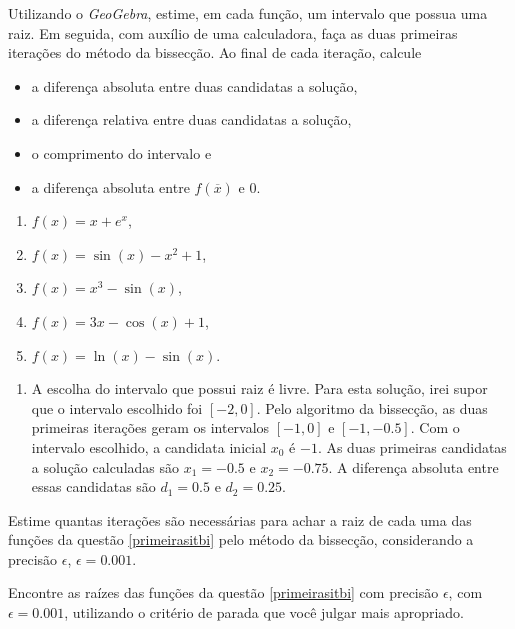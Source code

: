 \begin{ex}\label{primeirasitbi}
Utilizando o \emph{GeoGebra}, estime, em cada função, um intervalo que possua uma raiz. Em seguida, com auxílio de uma calculadora, faça as duas primeiras iterações do método da bissecção. Ao final de cada iteração, calcule 
\begin{itemize}
\item a diferença absoluta entre duas candidatas a solução, 
\item a diferença relativa entre duas candidatas a solução, 
\item o comprimento do intervalo e 
\item a diferença absoluta entre $f(\overline{x})$ e $0.$
\end{itemize}
\begin{enumerate}
\item $f(x)=x+e^x$,
\item $f(x)=\sin(x)-x^2+1$,
\item $f(x)=x^3-\sin(x)$,
\item $f(x)=3x-\cos(x)+1$,
\item $f(x)=\ln(x)-\sin(x)$.
\end{enumerate}
\begin{sol}
\begin{enumerate}
\item A escolha do intervalo que possui raiz é livre. Para esta solução, irei supor que o intervalo escolhido foi $[-2,0]$. Pelo algoritmo da bissecção, as duas primeiras iterações geram os intervalos $[-1,0]$ e $[-1,-0.5]$. Com o intervalo escolhido, a candidata inicial $x_0$ é $-1$. As duas primeiras candidatas a solução calculadas são $x_1=-0.5$ e $x_2=-0.75$. A diferença absoluta entre essas candidatas são $d_1=0.5$ e $d_2=0.25$.  
\end{enumerate}
\end{sol}
\end{ex}

\begin{ex}
Estime quantas iterações são necessárias para achar a raiz de cada uma das funções da questão \ref{primeirasitbi} pelo método da bissecção, considerando a precisão $\epsilon$, $\epsilon=0.001$. 
\end{ex}


\begin{ex}
Encontre as raízes das funções da questão \ref{primeirasitbi} com precisão $\epsilon$, com $\epsilon=0.001$, utilizando o critério de parada que você julgar mais apropriado.
\end{ex}

